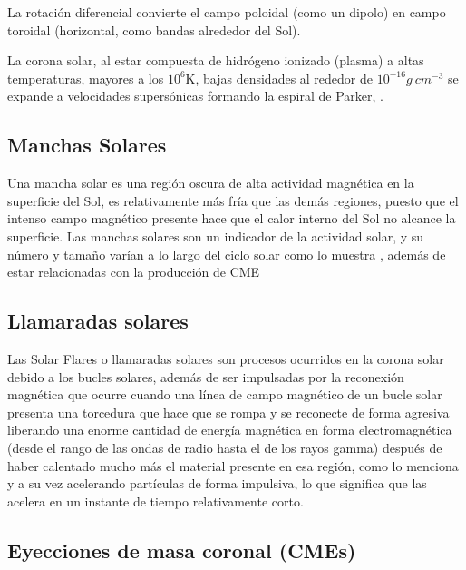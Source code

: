 La rotación diferencial convierte el campo poloidal (como un dipolo) en campo toroidal (horizontal, como bandas alrededor del Sol).

La corona solar, al estar compuesta de hidrógeno ionizado (plasma) a altas temperaturas, mayores a los $10^{6}$K, bajas densidades al rededor de $10^{-16}g~cm^{-3}$ se expande a velocidades supersónicas formando la espiral de Parker, \cite[e.g.,]{lugaz-2005}.


\subsection{Manchas Solares}
Una mancha solar es una región oscura de alta actividad magnética en la superficie del Sol, es relativamente más fría que las demás regiones, puesto que el intenso campo magnético presente hace que el calor interno del Sol no alcance la superficie. Las manchas solares son un indicador de la actividad solar, y su número y tamaño varían a lo largo del ciclo solar como lo muestra \cite[e.g.,][]{hathaway-2015}, además de estar relacionadas con la producción de \ac{CME}

\subsection{Llamaradas solares}
Las Solar Flares o llamaradas solares son procesos ocurridos en la corona solar debido a los bucles solares, además de ser impulsadas por la reconexión magnética que ocurre cuando una línea de campo magnético de un bucle solar presenta una torcedura que hace que se rompa y se reconecte de forma agresiva liberando una enorme cantidad de energía magnética en forma electromagnética (desde el rango de las ondas de radio hasta el de los rayos gamma) después de haber calentado mucho más el material presente en esa región, como lo menciona \cite[e.g.,][]{SolarFlares} y a su vez acelerando partículas de forma impulsiva, lo que significa que las acelera en un instante de tiempo relativamente corto.

\subsection{Eyecciones de masa coronal (CMEs)}


